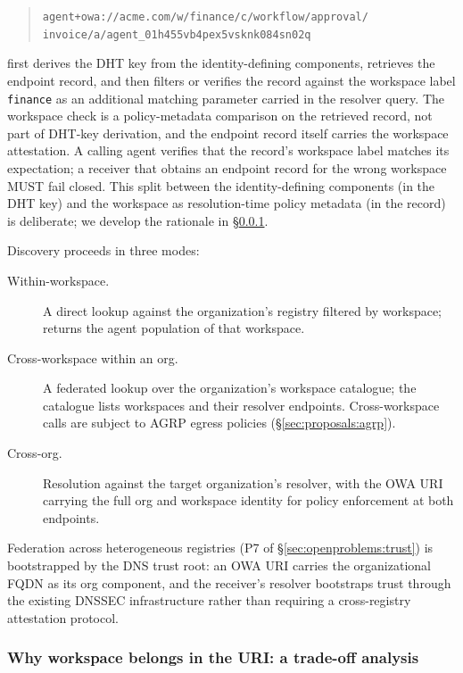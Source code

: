 \begin{quote}
\texttt{agent+owa://acme.com/w/finance/c/workflow/approval/}\\
\texttt{invoice/a/agent\_01h455vb4pex5vsknk084sn02q}
\end{quote}

first derives the DHT key from the identity-defining
components, retrieves the endpoint record, and then filters
or verifies the record against the workspace label
\texttt{finance} as an additional matching parameter
carried in the resolver query. The workspace check is a
policy-metadata comparison on the retrieved record, not
part of DHT-key derivation, and the endpoint record itself
carries the workspace attestation. A calling agent
verifies that the record's workspace label matches its
expectation; a receiver that obtains an endpoint record
for the wrong workspace MUST fail closed. This split
between the identity-defining components (in the DHT
key) and the workspace as resolution-time policy metadata
(in the record) is deliberate; we develop the rationale
in \S\ref{sec:proposals:owa:tradeoff}.

Discovery proceeds in three modes:

\begin{description}
  \item[Within-workspace.] A direct lookup against the
    organization's registry filtered by workspace; returns
    the agent population of that workspace.
  \item[Cross-workspace within an org.] A federated lookup
    over the organization's workspace catalogue; the
    catalogue lists workspaces and their resolver
    endpoints. Cross-workspace calls are subject to AGRP
    egress policies (\S\ref{sec:proposals:agrp}).
  \item[Cross-org.] Resolution against the target
    organization's resolver, with the OWA URI carrying
    the full org and workspace identity for policy
    enforcement at both endpoints.
\end{description}

Federation across heterogeneous registries (P7 of
\S\ref{sec:openproblems:trust}) is bootstrapped by the
DNS trust root: an OWA URI carries the
organizational FQDN as its org component, and the
receiver's resolver bootstraps trust through the existing
DNSSEC infrastructure rather than requiring a
cross-registry attestation protocol.

\subsubsection{Why workspace belongs in the URI: a trade-off analysis}
\label{sec:proposals:owa:tradeoff}

